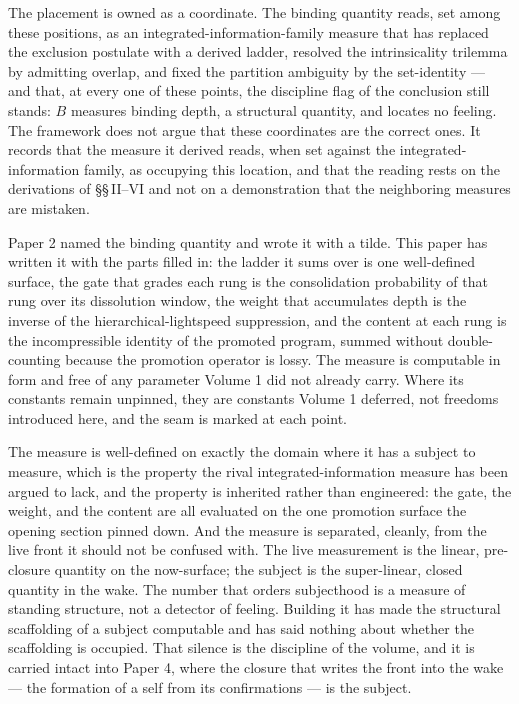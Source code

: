 \documentclass[11pt,oneside]{report}
\theoremstyle{definition}
\theoremstyle{remark}
\begin{document}
The placement is owned as a coordinate. The binding quantity reads, set among these positions, as an integrated-information-family measure that has replaced the exclusion postulate with a derived ladder, resolved the intrinsicality trilemma by admitting overlap, and fixed the partition ambiguity by the set-identity --- and that, at every one of these points, the discipline flag of the conclusion still stands: $B$ measures binding depth, a structural quantity, and locates no feeling. The framework does not argue that these coordinates are the correct ones. It records that the measure it derived reads, when set against the integrated-information family, as occupying this location, and that the reading rests on the derivations of \S\S\,II--VI and not on a demonstration that the neighboring measures are mistaken.



Paper 2 named the binding quantity and wrote it with a tilde. This paper has
written it with the parts filled in: the ladder it sums over is one
well-defined surface, the gate that grades each rung is the consolidation
probability of that rung over its dissolution window, the weight that
accumulates depth is the inverse of the hierarchical-lightspeed suppression,
and the content at each rung is the incompressible identity of the promoted
program, summed without double-counting because the promotion operator is
lossy. The measure is computable in form and free of any parameter Volume 1 did
not already carry. Where its constants remain unpinned, they are constants
Volume 1 deferred, not freedoms introduced here, and the seam is marked at each
point.

The measure is well-defined on exactly the domain where it has a subject to
measure, which is the property the rival integrated-information measure has been
argued to lack, and the property is inherited rather than engineered: the gate,
the weight, and the content are all evaluated on the one promotion surface the
opening section pinned down. And the measure is separated, cleanly, from the
live front it should not be confused with. The live measurement is the linear,
pre-closure quantity on the now-surface; the subject is the super-linear,
closed quantity in the wake. The number that orders subjecthood is a measure of
standing structure, not a detector of feeling. Building it has made the
structural scaffolding of a subject computable and has said nothing about
whether the scaffolding is occupied. That silence is the discipline of the
volume, and it is carried intact into Paper 4, where the closure that writes
the front into the wake --- the formation of a self from its confirmations --- is
the subject.
\end{document}
